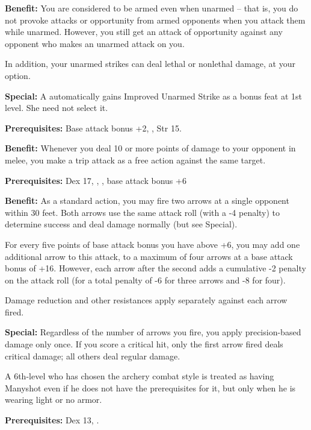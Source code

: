 \textbf{Benefit:} You are considered to be armed even when unarmed  -- that is, you do not provoke attacks or opportunity from armed opponents when you attack them while unarmed. However, you still get an attack of opportunity against any opponent who makes an unarmed attack on you.

In addition, your unarmed strikes can deal lethal or nonlethal damage, at your option.

\textbf{Special:} A  automatically gains Improved Unarmed Strike as a bonus feat at 1st level. She need not select it.


\textbf{Prerequisites:} Base attack bonus +2, , Str 15.

\textbf{Benefit:} Whenever you deal 10 or more points of damage to your opponent in melee, you make a trip attack as a free action against the same target.


\textbf{Prerequisites:} Dex 17, , , base attack bonus 
+6

\textbf{Benefit:} As a standard action, you may fire two arrows at a single opponent within 30 feet. Both arrows use the same attack roll (with a -4 penalty) to determine success and deal damage normally (but see Special).

For every five points of base attack bonus you have above +6, you may add one additional arrow to this attack, to a maximum of four arrows at a base attack bonus of +16. However, each arrow after the second adds a cumulative -2 penalty on the attack roll (for a total penalty of -6 for three arrows and -8 for four).

Damage reduction and other resistances apply separately against each arrow fired.

\textbf{Special:} Regardless of the number of arrows you fire, you apply precision-based damage only once. If you score a critical hit, only the first arrow fired deals critical damage; all others deal regular damage.

A 6th-level  who has chosen the archery combat style is treated as having Manyshot even if he does not have the prerequisites for it, but only when he is wearing light or no armor.


\textbf{Prerequisites:} Dex 13, .

